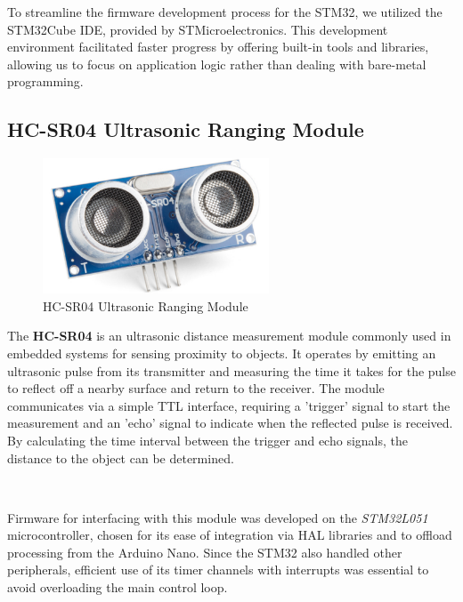 \documentclass{article}
\begin{document}
To streamline the firmware development process for the STM32, we utilized the STM32Cube IDE, provided by STMicroelectronics. This development environment facilitated faster progress by offering built-in tools and libraries, allowing us to focus on application logic rather than dealing with bare-metal programming.



\subsection{HC-SR04 Ultrasonic Ranging Module}
\label{sec:distancesensor}

\begin{figure}[H]
    \centering
    \includegraphics[width=0.6\textwidth]{Figures/distancesensor.png} %
    \caption{HC-SR04 Ultrasonic Ranging Module}
    \label{fig:distancesensor}
\end{figure}

The \textbf{HC-SR04} is an ultrasonic distance measurement module commonly used in embedded systems for sensing proximity to objects. It operates by emitting an ultrasonic pulse from its transmitter and measuring the time it takes for the pulse to reflect off a nearby surface and return to the receiver. The module communicates via a simple TTL interface, requiring a 'trigger' signal to start the measurement and an 'echo' signal to indicate when the reflected pulse is received. By calculating the time interval between the trigger and echo signals, the distance to the object can be determined.

\

Firmware for interfacing with this module was developed on the \emph{STM32L051} microcontroller, chosen for its ease of integration via HAL libraries and to offload processing from the Arduino Nano. Since the STM32 also handled other peripherals, efficient use of its timer channels with interrupts was essential to avoid overloading the main control loop.

\
\end{document}
